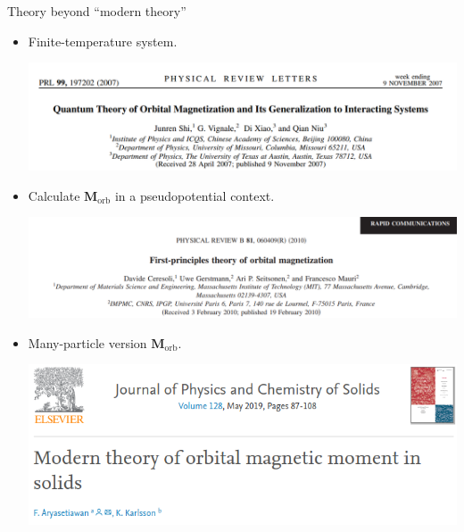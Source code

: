 \documentclass{beamer}
\begin{document}
    \begin{frame}{Theory beyond ``modern theory''}
      \begin{itemize}
        \item Finite-temperature system.\\
        \begin{tcolorbox}[beamer,width=0.6\textwidth,arc=0pt,boxsep=0.3pt,left=0pt,right=0pt,top=0pt,bottom=0pt]
          \includegraphics[width=\textwidth]{figure/Morb-temp.png}
        \end{tcolorbox}
        \item Calculate \(\bm{M}_{\text{orb}}\) in a pseudopotential context.\\
        \begin{tcolorbox}[beamer,width=0.6\textwidth,arc=0pt,boxsep=0.3pt,left=0pt,right=0pt,top=0pt,bottom=0pt]
          \includegraphics[width=\textwidth]{figure/Morb-DFT.png}
        \end{tcolorbox}
        \item Many-particle version \(\bm{M}_{\text{orb}}\).\\
        \begin{tcolorbox}[beamer,width=0.5\textwidth,arc=0pt,boxsep=0.3pt,left=0pt,right=0pt,top=0pt,bottom=0pt]
          \includegraphics[width=\textwidth]{figure/Morb-mp.png}
        \end{tcolorbox}
      \end{itemize}
    \end{frame}
\end{document}
